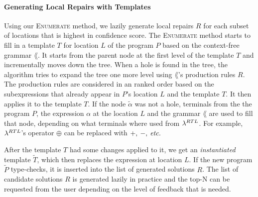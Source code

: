 

\paragraph{Generating Local Repairs with Templates}
Using our \textsc{Enumerate} method, we lazily generate local repairs $R$ for
each subset of locations that is highest in confidence score. The
\textsc{Enumerate} method starts to fill in a template $T$ for location $L$ of
the program $P$ based on the context-free grammar $\lang$. It starts from the
parent node at the first level of the template $T$ and incrementally moves
down the tree. When a hole is found in the tree, the algorithm tries to expand
the tree one more level using $\lang$'s production rules $R$. The production
rules are considered in an ranked order based on the subexpressions that already
appear in $P$'s location $L$ and the template $T$. It then applies it to the
template $T$. If the node $\tilde{\alpha}$ was not a hole, terminals from the
the program $P$, the expression $\alpha$ at the location $L$ and the grammar
$\lang$ are used to fill that node, depending on what terminals where used from
$\lambda^{RTL}$. For example, $\lambda^{RTL}$'s operator $\oplus$ can be replaced
with $+,\:-,\:\textit{etc.}$

After the template $T$ had some changes applied to it, we get an
\emph{instantiated} template $\tilde{T}$, which then replaces the expression at
location $L$. If the new program $\tilde{P}$ type-checks, it is inserted into
the list of generated solutions $R$. The list of candidate solutions $R$ is
generated lazily in practice and the top-N can be requested from the user
depending on the level of feedback that is needed.



